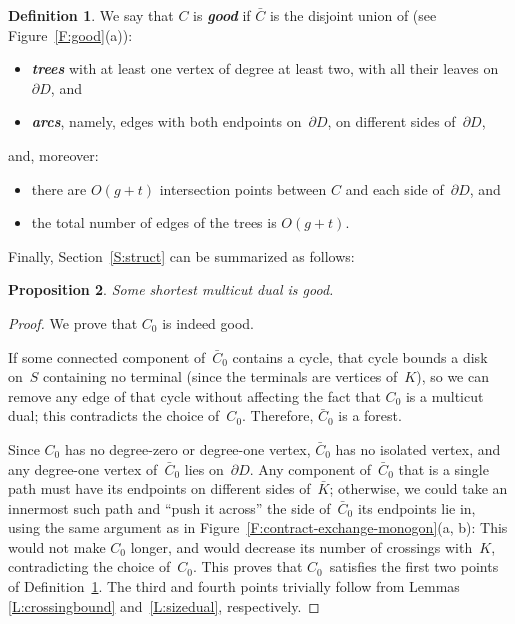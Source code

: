 \documentclass[11pt]{article}
\newcommand{\emphdef}[1]{\textcolor{blueblack}{\textbf{\emph{#1}}}}
\newcommand{\CC}{\ensuremath{\bar{C}}}
\newcommand{\KK}{\ensuremath{\bar{K}}}
\theoremstyle{plain}  \newtheorem{theorem}{Theorem}[section]
\newtheorem{proposition}[theorem]{Proposition}
\theoremstyle{definition}
\newtheorem{definition}[theorem]{Definition}
\begin{document}
\begin{definition}\label{D:good}
  We say that $C$ is \emphdef{good} if $\CC$ is the disjoint union of (see
  Figure~\ref{F:good}(a)):
  \begin{itemize}
  \item \emphdef{trees} with at least one vertex of degree at least two,
    with all their leaves on~$\partial D$, and
  \item \emphdef{arcs}, namely, edges with both endpoints on~$\partial D$,
    on different sides of~$\partial D$,
  \end{itemize}
  and, moreover:
  \begin{itemize}
  \item there are $O(g+t)$ intersection points between $C$ and each side
    of~$\partial D$, and
  \item the total number of edges of the trees is $O(g+t)$.
  \end{itemize}
\end{definition}
Finally, Section~\ref{S:struct} can be summarized as follows:
\begin{proposition}\label{P:struct}
  Some shortest multicut dual is good.
\end{proposition}
\begin{proof}
  We prove that $C_0$ is indeed good.

  If some connected component of~$\CC_0$ contains a cycle, that cycle
  bounds a disk on~$S$ containing no terminal (since the terminals are
  vertices of~$K$), so we can remove any edge of that cycle without
  affecting the fact that $C_0$ is a multicut dual; this contradicts the
  choice of~$C_0$.  Therefore, $\CC_0$ is a forest.

  Since $C_0$ has no degree-zero or degree-one vertex, $\CC_0$ has no
  isolated vertex, and any degree-one vertex of~$\CC_0$ lies on~$\partial
  D$.  Any component of~$\CC_0$ that is a single path must have its
  endpoints on different sides of~$\KK$; otherwise, we could take an
  innermost such path and ``push it across'' the side of~$\CC_0$ its
  endpoints lie in, using the same argument as in
  Figure~\ref{F:contract-exchange-monogon}(a, b): This would not make $C_0$
  longer, and would decrease its number of crossings with~$K$,
  contradicting the choice of~$C_0$.  This proves that $C_0$~satisfies the
  first two points of Definition~\ref{D:good}.  The third and fourth points
  trivially follow from Lemmas \ref{L:crossingbound} and~\ref{L:sizedual},
  respectively.
\end{proof}
\end{document}
